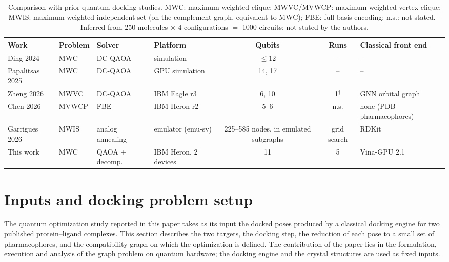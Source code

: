 \documentclass{iopjournal}
\begin{document}
\begin{table}[htbp]
\caption{Comparison with prior quantum docking studies. MWC: maximum weighted clique; MWVC/MVWCP: maximum weighted vertex clique; MWIS: maximum weighted independent set (on the complement graph, equivalent to MWC); FBE: full-basis encoding; n.s.: not stated. $^{\dagger}$Inferred from 250 molecules $\times$ 4 configurations $=$ 1000 circuits; not stated by the authors.}
\label{tab:related}
\centering
\footnotesize
\begin{tabularx}{\textwidth}{@{}>{\raggedright\arraybackslash}p{2.6cm} l l >{\raggedright\arraybackslash}X c c >{\raggedright\arraybackslash}X@{}}
\toprule
Work & Problem & Solver & Platform & Qubits & Runs & Classical front end \\
\midrule
Ding 2024 \cite{ding2024docking} & MWC & DC-QAOA & simulation & $\le 12$ & -- & -- \\
Papalitsas 2025 \cite{papalitsas2025qaoa} & MWC & DC-QAOA & GPU simulation & 14, 17 & -- & -- \\
Zheng 2026 \cite{zheng2026qscore} & MWVC & DC-QAOA & IBM Eagle r3 & 6, 10 & 1$^{\dagger}$ & GNN orbital graph \\
Chen 2026 \cite{chen2026fbe} & MVWCP & FBE & IBM Heron r2 & 5--6 & n.s. & none (PDB pharmacophores) \\
Garrigues 2026 \cite{garrigues2026scalable} & MWIS & analog annealing & emulator (emu-sv) & 225--585 nodes, in emulated subgraphs & grid search & RDKit \\
This work & MWC & QAOA + decomp. & IBM Heron, 2 devices & 11 & 5 & Vina-GPU 2.1 \\
\bottomrule
\end{tabularx}
\end{table}

\section{Inputs and docking problem setup}
\label{sec:inputs}

The quantum optimization study reported in this paper takes as its input the docked poses produced by a classical docking engine for two published protein--ligand complexes. This section describes the two targets, the docking step, the reduction of each pose to a small set of pharmacophores, and the compatibility graph on which the optimization is defined. The contribution of the paper lies in the formulation, execution and analysis of the graph problem on quantum hardware; the docking engine and the crystal structures are used as fixed inputs.
\end{document}
